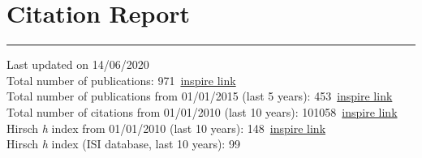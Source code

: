 \documentclass[10pt, a4paper]{article}
\newcommand{\years}[1]{\marginnote{\hskip-0.2in{\scriptsize #1}}}
\begin{document}
\section*{Citation Report}
\vspace{-5pt}
\hrule
\vspace{10pt}
\noindent
Last updated on 14/06/2020\\[1em]
Total number of publications:
971~\href{http://inspirehep.net/search?ln=en&ln=en&p=find+a+santanastasio+and+tc+p+and+date\%3C\%3D2020-06-14&of=hb&action_search=Search&sf=&so=a&rm=&rg=25&sc=0}{inspire
link}\\
Total number of publications from 01/01/2015 (last 5 years): 453~\href{http://inspirehep.net/search?ln=en&ln=en&p=find+a+santanastasio+and+tc+p+and+date\%3C\%3D2018-06-14+and+date\%3E\%3D2015-01-01&of=hb&action_search=Search&sf=&so=a&rm=&rg=25&sc=0}{inspire
link}\\
Total number of citations from 01/01/2010 (last 10 years): 101058~\href{http://inspirehep.net/search?ln=en&ln=en&p=find+a+santanastasio+and+tc+p+and+date\%3E\%3D2010-01-01+and+date\%3C\%3D2020-06-14&of=hcs&action_search=Search&sf=&so=a&rm=&rg=25&sc=0}{inspire
link}\\
Hirsch {\it h} index from 01/01/2010 (last 10 years): 148~\href{http://inspirehep.net/search?ln=en&ln=en&p=find+a+santanastasio+and+tc+p+and+date\%3E\%3D2010-01-01+and+date\%3C\%3D2020-06-14&of=hcs&action_search=Search&sf=&so=a&rm=&rg=25&sc=0}{inspire
link}\\
Hirsch {\it h} index (ISI database, last 10 years): 99\\ 
\end{document}
